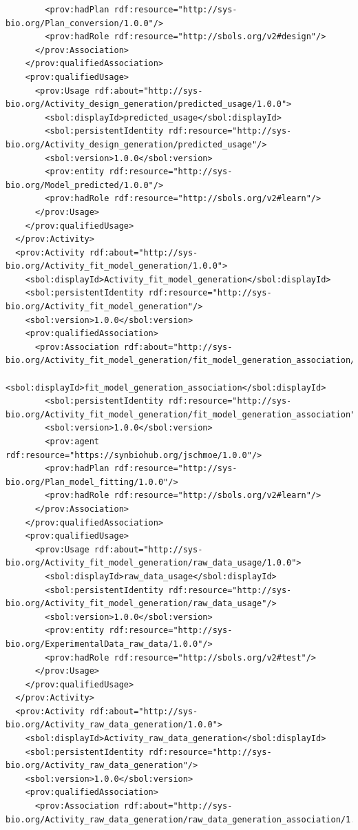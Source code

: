 \begin{lstlisting}
        <prov:hadPlan rdf:resource="http://sys-bio.org/Plan_conversion/1.0.0"/>
        <prov:hadRole rdf:resource="http://sbols.org/v2#design"/>
      </prov:Association>
    </prov:qualifiedAssociation>
    <prov:qualifiedUsage>
      <prov:Usage rdf:about="http://sys-bio.org/Activity_design_generation/predicted_usage/1.0.0">
        <sbol:displayId>predicted_usage</sbol:displayId>
        <sbol:persistentIdentity rdf:resource="http://sys-bio.org/Activity_design_generation/predicted_usage"/>
        <sbol:version>1.0.0</sbol:version>
        <prov:entity rdf:resource="http://sys-bio.org/Model_predicted/1.0.0"/>
        <prov:hadRole rdf:resource="http://sbols.org/v2#learn"/>
      </prov:Usage>
    </prov:qualifiedUsage>
  </prov:Activity>
  <prov:Activity rdf:about="http://sys-bio.org/Activity_fit_model_generation/1.0.0">
    <sbol:displayId>Activity_fit_model_generation</sbol:displayId>
    <sbol:persistentIdentity rdf:resource="http://sys-bio.org/Activity_fit_model_generation"/>
    <sbol:version>1.0.0</sbol:version>
    <prov:qualifiedAssociation>
      <prov:Association rdf:about="http://sys-bio.org/Activity_fit_model_generation/fit_model_generation_association/1.0.0">
        <sbol:displayId>fit_model_generation_association</sbol:displayId>
        <sbol:persistentIdentity rdf:resource="http://sys-bio.org/Activity_fit_model_generation/fit_model_generation_association"/>
        <sbol:version>1.0.0</sbol:version>
        <prov:agent rdf:resource="https://synbiohub.org/jschmoe/1.0.0"/>
        <prov:hadPlan rdf:resource="http://sys-bio.org/Plan_model_fitting/1.0.0"/>
        <prov:hadRole rdf:resource="http://sbols.org/v2#learn"/>
      </prov:Association>
    </prov:qualifiedAssociation>
    <prov:qualifiedUsage>
      <prov:Usage rdf:about="http://sys-bio.org/Activity_fit_model_generation/raw_data_usage/1.0.0">
        <sbol:displayId>raw_data_usage</sbol:displayId>
        <sbol:persistentIdentity rdf:resource="http://sys-bio.org/Activity_fit_model_generation/raw_data_usage"/>
        <sbol:version>1.0.0</sbol:version>
        <prov:entity rdf:resource="http://sys-bio.org/ExperimentalData_raw_data/1.0.0"/>
        <prov:hadRole rdf:resource="http://sbols.org/v2#test"/>
      </prov:Usage>
    </prov:qualifiedUsage>
  </prov:Activity>
  <prov:Activity rdf:about="http://sys-bio.org/Activity_raw_data_generation/1.0.0">
    <sbol:displayId>Activity_raw_data_generation</sbol:displayId>
    <sbol:persistentIdentity rdf:resource="http://sys-bio.org/Activity_raw_data_generation"/>
    <sbol:version>1.0.0</sbol:version>
    <prov:qualifiedAssociation>
      <prov:Association rdf:about="http://sys-bio.org/Activity_raw_data_generation/raw_data_generation_association/1.0.0">

\end{lstlisting}
